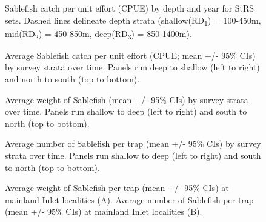 \documentclass[12pt]{article}\usepackage[]{graphicx}\usepackage[]{color}
\begin{document}
\begin{figure}[htb]

{\centering {} 

}

\caption{Sablefish catch per unit effort (CPUE) by depth and year for StRS sets. Dashed lines delineate depth strata (shallow(RD\textsubscript{1}) = 100-450m, mid(RD\textsubscript{2}) = 450-850m, deep(RD\textsubscript{3}) = 850-1400m).}\label{fig:figure5}
\end{figure}
\clearpage


\begin{figure}[htb]

{\centering {} 

}

\caption{Average Sablefish catch per unit effort (CPUE; mean +/- 95\% CIs) by survey strata over time. Panels run deep to shallow (left to right) and north to south (top to bottom).}\label{fig:figure6}
\end{figure}

\begin{figure}[htb]

{\centering {} 

}

\caption{Average weight of Sablefish (mean +/- 95\% CIs) by survey strata over time. Panels run shallow to deep (left to right) and south to north (top to bottom).}\label{fig:figure7}
\end{figure}

\begin{figure}[htb]

{\centering {} 

}

\caption{Average number of Sablefish per trap (mean +/- 95\% CIs) by survey strata over time. Panels run shallow to deep (left to right) and south to north (top to bottom).}\label{fig:figure8}
\end{figure}

\begin{figure}[htb]

{\centering {} 

}

\caption{Average weight of Sablefish per trap (mean +/- 95\% CIs) at mainland Inlet localities (A). Average number of Sablefish per trap (mean +/- 95\% CIs) at mainland Inlet localities (B).}\label{fig:figure9}
\end{figure}
\clearpage
\end{document}
